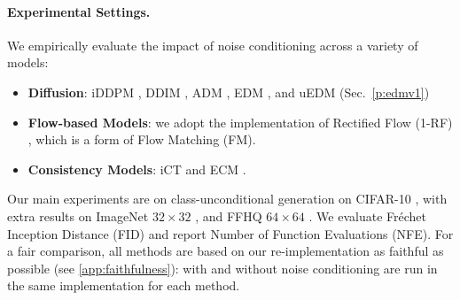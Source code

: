 \paragraph{Experimental Settings.}

We empirically evaluate the impact of noise conditioning across a variety of models: 
\begin{itemize}[topsep=.5em,itemsep=0pt]
    \item \textbf{Diffusion}: iDDPM \cite{nichol2021iddpm}, DDIM \cite{song2021ddim}, ADM \cite{dhariwal2021diffusion}, EDM \cite{karras2022edm}, and uEDM (Sec.~\ref{p:edmv1})
    \item \textbf{Flow-based Models}: we adopt the implementation of Rectified Flow (1-RF) \cite{liu2023flow}, which is a form of Flow Matching \cite{lipman2023flow} (FM).
    \item \textbf{Consistency Models}: iCT \cite{song2024improved} and ECM \cite{geng2025consistency}.
\end{itemize}
\vspace{-.5em}
Our main experiments are on class-unconditional generation on CIFAR-10 \cite{krizhevsky2009CIFAR}, with extra results on ImageNet $32{\times}32$ \cite{deng2009imagenet}, and FFHQ $64{\times}64$ \cite{karras2019style}.
We evaluate Fr\'echet Inception Distance (FID) \cite{heusel2017FID} and report Number of Function Evaluations (NFE).
For a fair comparison, all methods are based on our re-implementation as faithful as possible (see \cref{app:faithfulness}): with and without noise conditioning are run in the same implementation for each method.

